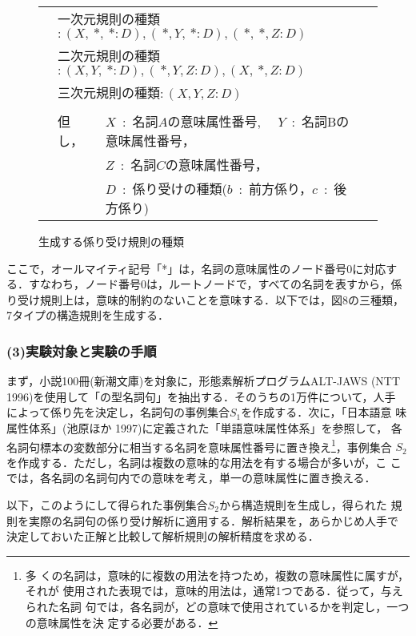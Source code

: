 \begin{figure}[htb]
 {\small 
 \begin{tabular}{|cllc|} \hline
 \hspace*{40pt} & \multicolumn{2}{l}{一次元規則の種類$:(X,\ * ,\ * :D),(\ * ,Y,\ * :D),(\ * ,\ * ,Z:D)$} & \hspace{70pt} \\
 & \multicolumn{2}{l}{二次元規則の種類$:(X,Y,\ * :D),(\ * ,Y,Z:D),(X,\ * ,Z:D)$} & \\
 & \multicolumn{2}{l}{三次元規則の種類$:(X,Y,Z:D)$} & \\
 & & & \\
 & 但し，& $X$\ :\ 名詞$A$の意味属性番号, \ \ $Y$\ :\ 名詞Bの意味属性番号，& \\
 & & $Z$\ :\ 名詞$C$の意味属性番号，& \\
 & & $D$\ :\ 係り受けの種類($b$\ :\ 前方係り，$c$\ :\ 後方係り) & \\ \hline
 \end{tabular}
 }
\caption{生成する係り受け規則の種類}
\end{figure}

ここで，オールマイティ記号「*」は，名詞の意味属性のノード番号0に対応す
る．すなわち，ノード番号0は，ルートノードで，すべての名詞を表すから，係
り受け規則上は，意味的制約のないことを意味する．以下では，図8の三種類，
7タイプの構造規則を生成する．
\subsubsection*{(3)実験対象と実験の手順}

まず，小説100冊(新潮文庫)を対象に，形態素解析プログラムALT-JAWS (NTT
1996)を使用して「の型名詞句」を抽出する．そのうちの1万件について，人手
によって係り先を決定し，名詞句の事例集合${S_1}$を作成する．次に，「日本語意
味属性体系」(池原ほか 1997)に定義された「単語意味属性体系」を参照して，
各名詞句標本の変数部分に相当する名詞を意味属性番号に置き換え\footnote{多
くの名詞は，意味的に複数の用法を持つため，複数の意味属性に属すが，それが
使用された表現では，意味的用法は，通常1つである．従って，与えられた名詞
句では，各名詞が，どの意味で使用されているかを判定し，一つの意味属性を決
定する必要がある．}，事例集合
${S_2}$を作成する．ただし，名詞は複数の意味的な用法を有する場合が多いが，こ
こでは，各名詞の名詞句内での意味を考え，単一の意味属性に置き換える．

以下，このようにして得られた事例集合${S_2}$から構造規則を生成し，得られた
規則を実際の名詞句の係り受け解析に適用する．解析結果を，あらかじめ人手で
決定しておいた正解と比較して解析規則の解析精度を求める．

